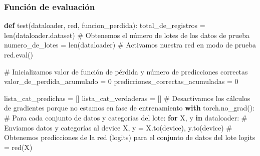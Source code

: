 \documentclass[
  10pt,
]{article}
\newenvironment{Shaded}{\begin{snugshade}}{\end{snugshade}}
\newcommand{\BuiltInTok}[1]{\textcolor[rgb]{0.00,0.23,0.31}{#1}}
\newcommand{\CommentTok}[1]{\textcolor[rgb]{0.37,0.37,0.37}{#1}}
\newcommand{\ControlFlowTok}[1]{\textcolor[rgb]{0.00,0.23,0.31}{\textbf{#1}}}
\newcommand{\DecValTok}[1]{\textcolor[rgb]{0.68,0.00,0.00}{#1}}
\newcommand{\KeywordTok}[1]{\textcolor[rgb]{0.00,0.23,0.31}{\textbf{#1}}}
\newcommand{\NormalTok}[1]{\textcolor[rgb]{0.00,0.23,0.31}{#1}}
\newcommand{\OperatorTok}[1]{\textcolor[rgb]{0.37,0.37,0.37}{#1}}
\begin{document}
\subsubsection{Función de evaluación}\label{funciuxf3n-de-evaluaciuxf3n}

\begin{Shaded}
\begin{Highlighting}[]
\KeywordTok{def}\NormalTok{ test(dataloader, red, funcion\_perdida):}
\NormalTok{    total\_de\_registros }\OperatorTok{=} \BuiltInTok{len}\NormalTok{(dataloader.dataset)}
    \CommentTok{\# Obtenemos el número de lotes de los datos de prueba}
\NormalTok{    numero\_de\_lotes }\OperatorTok{=} \BuiltInTok{len}\NormalTok{(dataloader)}
    \CommentTok{\# Activamos nuestra red en modo de prueba}
\NormalTok{    red.}\BuiltInTok{eval}\NormalTok{()}

    \CommentTok{\# Inicializamos valor de función de pérdida y número de predicciones correctas}
\NormalTok{    valor\_de\_perdida\_acumulado }\OperatorTok{=} \DecValTok{0}
\NormalTok{    predicciones\_correctas\_acumuladas }\OperatorTok{=} \DecValTok{0}

\NormalTok{    lista\_cat\_predichas }\OperatorTok{=}\NormalTok{ []}
\NormalTok{    lista\_cat\_verdaderas }\OperatorTok{=}\NormalTok{ []}
    \CommentTok{\# Desactivamos los cálculos de gradientes porque no estamos en fase de entrenamiento}
    \ControlFlowTok{with}\NormalTok{ torch.no\_grad():}
        \CommentTok{\# Para cada conjunto de datos y categorías del lote:}
        \ControlFlowTok{for}\NormalTok{ X, y }\KeywordTok{in}\NormalTok{ dataloader:}
            \CommentTok{\# Enviamos datos y categorías al device}
\NormalTok{            X, y }\OperatorTok{=}\NormalTok{ X.to(device), y.to(device)}
            \CommentTok{\# Obtenemos predicciones de la red (logits) para el conjunto de datos del lote}
\NormalTok{            logits }\OperatorTok{=}\NormalTok{ red(X)}


\end{Highlighting}
\end{Shaded}
\end{document}
